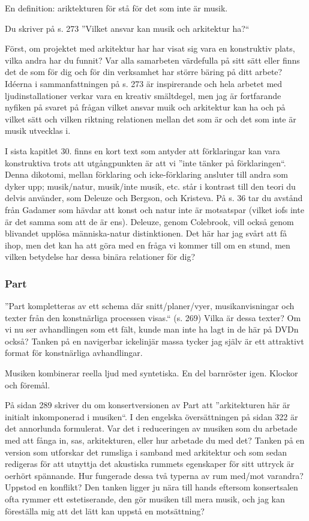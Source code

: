 \documentclass{article}
\begin{document}
En definition: ariktekturen för stå för det som inte är musik.

Du skriver på s. 273 ''Vilket ansvar kan musik och arkitektur ha?``

Först, om projektet med arkitektur har har visat sig vara en konstruktiv plats, vilka andra har du funnit? Var alla samarbeten värdefulla på sitt sätt eller finns det de som för dig och för din verksamhet har större bäring på ditt arbete? Idéerna i sammanfattningen på s. 273 är inspirerande och hela arbetet med ljudinstallationer verkar vara en kreativ smältdegel, men jag är fortfarande nyfiken på svaret på frågan vilket ansvar muik och arkitektur kan ha och på vilket sätt och vilken riktning relationen mellan det som är och det som inte är musik utvecklas i.

I sista kapitlet 30. finns en kort text som antyder att förklaringar kan vara konstruktiva trots att utgångpunkten är att vi ''inte tänker på förklaringen``. Denna dikotomi, mellan förklaring och icke-förklaring ansluter till andra som dyker upp; musik/natur, musik/inte musik, etc. står i kontrast till den teori du delvis använder, som Deleuze och Bergson, och Kristeva. På s. 36 tar du avstånd från Gadamer som hävdar att konst och natur inte är motsatspar (vilket iofs inte är det samma som att de är ens). Deleuze, genom Colebrook, vill också genom blivandet upplösa människa-natur distinktionen. Det här har jag svårt att få ihop, men det kan ha att göra med en fråga vi kommer till om en stund, men vilken betydelse har dessa binära relationer för dig?


\subsubsection{Part}

''Part kompletteras av ett schema där snitt/planer/vyer, musikanvisningar och texter från den konstnärliga processen visas.`` (s. 269) Vilka är dessa texter? Om vi nu ser avhandlingen som ett fält, kunde man inte ha lagt in de här på DVDn också? Tanken på en navigerbar ickelinjär massa tycker jag själv är ett attraktivt format för konstnärliga avhandlingar.

Musiken kombinerar reella ljud med syntetiska. En del barnröster igen. Klockor och föremål.

På sidan 289 skriver du om konsertversionen av Part att ''arkitekturen här är initialt inkomponerad i musiken``. I den engelska översättningen på sidan 322 är det annorlunda formulerat. Var det i reduceringen av musiken som du arbetade med att fånga in, sas, arkitekturen, eller hur arbetade du med det? Tanken på en version som utforskar det rumsliga i samband med arkitektur och som sedan redigeras för att utnyttja det akustiska rummets egenskaper för sitt uttryck är oerhört spännande. Hur fungerade dessa två typerna av rum med/mot varandra? Uppstod en konflikt? Den tanken ligger ju nära till hands eftersom konsertsalen ofta rymmer ett estetiserande, den gör musiken till mera musik, och jag kan föreställa mig att det lätt kan uppstå en motsättning?
\end{document}

